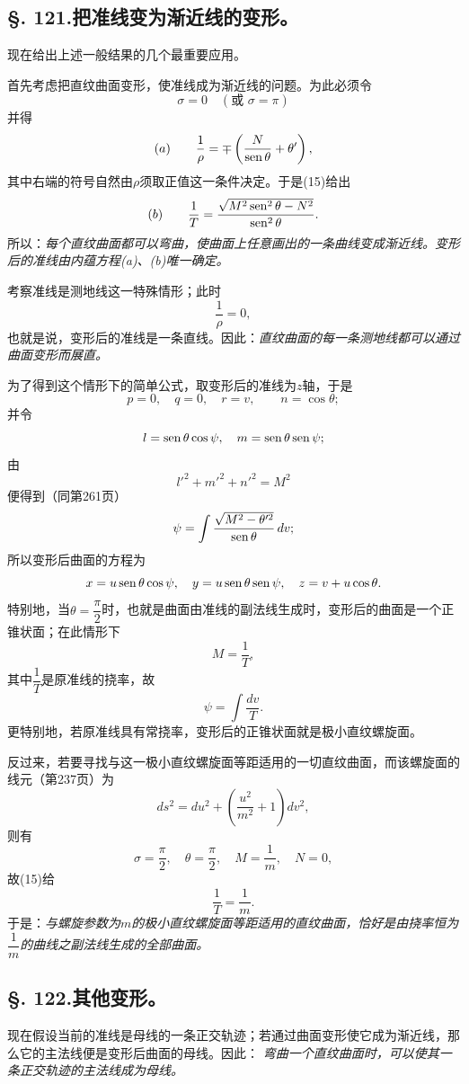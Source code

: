 \subsection*{\S. 121.\quad 把准线变为渐近线的变形。}

现在给出上述一般结果的几个最重要应用。

首先考虑把直纹曲面变形，使准线成为渐近线的问题。为此必须令
\[
 \sigma=0\quad (\text{或 }\sigma=\pi)
\]
并得
\[
 (a)\qquad \frac1\rho=\mp\left(\frac{N}{\operatorname{sen}\theta}+\theta'\right),
\]
其中右端的符号自然由\(\rho\)须取正值这一条件决定。于是(15)给出
\[
 (b)\qquad \frac1T=\frac{\sqrt{M^2\operatorname{sen}^2\theta-N^2}}{\operatorname{sen}^2\theta}.
\]
所以：\emph{每个直纹曲面都可以弯曲，使曲面上任意画出的一条曲线变成渐近线。变形后的准线由内蕴方程(a)、(b)唯一确定。}

考察准线是测地线这一特殊情形；此时
\[
 \frac1\rho=0,
\]
也就是说，变形后的准线是一条直线。因此：\emph{直纹曲面的每一条测地线都可以通过曲面变形而展直。}

为了得到这个情形下的简单公式，取变形后的准线为\(z\)轴，于是
\[
 p=0,
 \quad q=0,
 \quad r=v,
 \qquad n=\cos\theta;
\]
并令
\[
 l=\operatorname{sen}\theta\cos\psi,
 \quad m=\operatorname{sen}\theta\operatorname{sen}\psi;
\]
由
\[
 l'^2+m'^2+n'^2=M^2
\]
便得到（同第261页）
\[
 \psi=\int\frac{\sqrt{M^2-\theta'^2}}{\operatorname{sen}\theta}\,dv;
\]
所以变形后曲面的方程为
\[
 x=u\operatorname{sen}\theta\cos\psi,
 \quad y=u\operatorname{sen}\theta\operatorname{sen}\psi,
 \quad z=v+u\cos\theta.
\]
特别地，当\(\theta=\dfrac\pi2\)时，也就是曲面由准线的副法线生成时，变形后的曲面是一个正锥状面；在此情形下
\[
 M=\frac1T,
\]
其中\(\dfrac1T\)是原准线的挠率，故
\[
 \psi=\int\frac{dv}{T}.
\]
更特别地，若原准线具有常挠率，变形后的正锥状面就是极小直纹螺旋面。

反过来，若要寻找与这一极小直纹螺旋面等距适用的一切直纹曲面，而该螺旋面的线元（第237页）为
\[
 ds^2=du^2+\left(\frac{u^2}{m^2}+1\right)dv^2,
\]
则有
\[
 \sigma=\frac\pi2,
 \quad \theta=\frac\pi2,
 \quad M=\frac1m,
 \quad N=0,
\]
故(15)给
\[
 \frac1T=\frac1m.
\]
于是：\emph{与螺旋参数为\(m\)的极小直纹螺旋面等距适用的直纹曲面，恰好是由挠率恒为\(\dfrac1m\)的曲线之副法线生成的全部曲面。}

\subsection*{\S. 122.\quad 其他变形。}

现在假设当前的准线是母线的一条正交轨迹；若通过曲面变形使它成为渐近线，那么它的主法线便是变形后曲面的母线。因此：
\emph{弯曲一个直纹曲面时，可以使其一条正交轨迹的主法线成为母线。}

